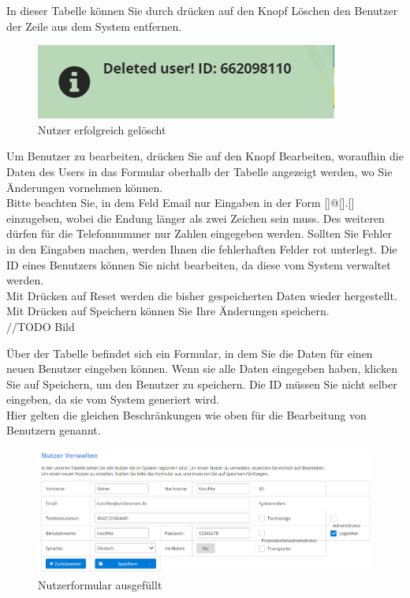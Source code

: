 \documentclass[enabledeprecatedfontcommands,fontsize=12pt,paper=a4,twoside]{scrartcl}
\begin{document}
 In dieser Tabelle können Sie durch drücken auf den Knopf Löschen den Benutzer der Zeile aus dem System entfernen.  \\
\begin{figure}[h!]
\begin{center}
 \includegraphics[width=\textwidth]{screenshots/admin/nutzerloeschen.png}
  \caption{Nutzer erfolgreich gelöscht}
  \label{fig:boat2}
\end{center}
\end{figure}

Um Benutzer zu bearbeiten, drücken Sie auf den Knopf Bearbeiten, woraufhin die Daten des Users in das Formular oberhalb der Tabelle angezeigt werden, wo Sie Änderungen vornehmen können. \\
Bitte beachten Sie, in dem Feld Email nur Eingaben in der Form []@[].[] einzugeben, wobei die Endung länger als zwei Zeichen sein muss. Des weiteren dürfen für die Telefonnummer nur Zahlen eingegeben werden. Sollten Sie Fehler in den Eingaben machen, werden Ihnen die fehlerhaften Felder rot unterlegt. Die ID eines Benutzers können Sie nicht bearbeiten, da diese vom System verwaltet werden. \\
Mit Drücken auf Reset werden die bisher gespeicherten Daten wieder hergestellt. Mit Drücken auf Speichern können Sie Ihre Änderungen speichern. \\

//TODO Bild

Über der Tabelle befindet sich ein Formular, in dem Sie die Daten für einen neuen Benutzer eingeben können. Wenn sie alle Daten eingegeben haben, klicken Sie auf Speichern, um den Benutzer zu speichern. Die ID müssen Sie nicht selber eingeben, da sie vom System generiert wird. \\
Hier gelten die gleichen Beschränkungen wie oben für die Bearbeitung von Benutzern genannt. \\

\begin{figure}[h!]
\begin{center}
 \includegraphics[width=\textwidth]{screenshots/admin/nutzerformularausgefuellt.png}
  \caption{Nutzerformular ausgefüllt}
  \label{fig:boat3}
\end{center}
\end{figure}
\end{document}
